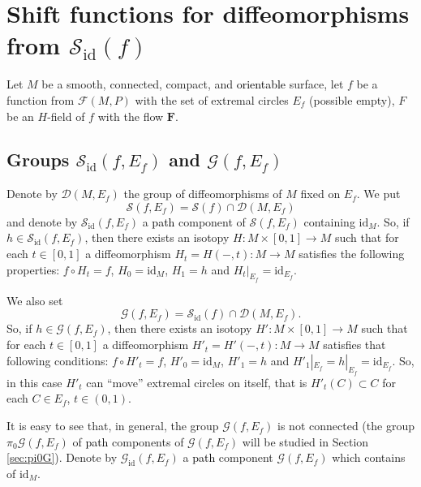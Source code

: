 \documentclass[10pt,reqno]{amsart}
\newcommand{\bfF}{\mathbf{F}}
\newcommand{\Sid}{\mathcal{S}_{\id}(f)}
\newcommand{\F}{\mathcal{F}(M,P)}
\newcommand{\id}{\mathrm{id}}
\newcommand{\textr}[1]{\textcolor{black}{#1}}
\begin{document}
 



\section{Shift functions for diffeomorphisms from $\mathcal{S}_{\id}(f)$}\label{sec:shift-diff}
Let $M$ be a smooth, connected, compact, and  \textr{orientable} surface, let $f$ be a function from $\F$ with the set of extremal circles $E_f$ (possible empty), $F$ be an $H$-field of $f$ with the flow $\bfF$.
\subsection{Groups $\mathcal{S}_{\id}(f,E_f)$ and $\mathcal{G}(f,E_f)$}\label{ssec:groupsSidE}
{Denote by $\mathcal{D}(M,E_f)$ the group of diffeomorphisms of $M$ fixed on $E_f$. 
We put 
\begin{equation}\label{eq:SfEf}
\mathcal{S}(f,E_f) = \mathcal{S}(f)\cap \mathcal{D}(M,E_f)
\end{equation}
and denote by $\mathcal{S}_{\id}(f,E_f)$ a \textr{path} component of $\mathcal{S}(f,E_f)$ containing $\id_M$. So, if $h\in \mathcal{S}_{\id}(f,E_f)$, then there exists an isotopy $H:M\times [0,1]\to M$ such that for each $t\in [0,1]$ a diffeomorphism $H_t = H(-,t):M\to M$ satisfies the following properties: $f\circ H_t = f$, $H_0 = \id_M$, $H_1 = h$ and $H_t|_{E_f} = \id_{E_f}.$

We also set
\begin{equation}\label{eq:G}
\mathcal{G}(f, E_f) =  \Sid\cap \mathcal{D}(M,E_f).
\end{equation}
 So, if $h\in \mathcal{G}(f,E_f)$, then there exists an isotopy $H':M\times [0,1]\to M$ such that for each $t\in [0,1]$ a diffeomorphism $H'_t = H'(-,t):M\to M$ satisfies that following conditions: $f\circ H'_t = f$, $H'_0 = \id_M$, $H'_1 = h$ and $H'_1|_{E_f} = h|_{E_f} = \id_{E_f}$. So, in this case   $H'_t$ can ``move'' extremal circles on itself, that is $H'_t(C) \subset C$ for each $C\in E_f$, $t\in (0,1)$.}

It is easy to see that, in general, the group $\mathcal{G}(f,E_f)$ is not connected (the group $\pi_0\mathcal{G}(f,E_f)$ of \textr{path} components of $\mathcal{G}(f,E_f)$ will be studied in Section \ref{sec:pi0G}). Denote by  $\mathcal{G}_{\id}(f,E_f)$  a \textr{path} component $\mathcal{G}(f,E_f)$ which contains of $\id_M$. 
\end{document}
